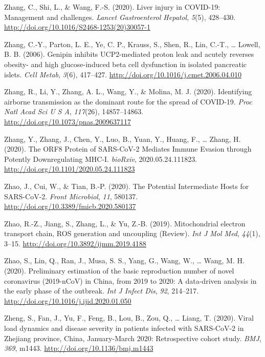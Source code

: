 \documentclass[12pt,twoside,openany,\mydriver]{thesis}  %
\begin{document}
\leavevmode\hypertarget{ref-zhang_liver_2020}{}%
Zhang, C., Shi, L., \& Wang, F.-S. (2020). Liver injury in COVID-19: Management and challenges. \emph{Lancet Gastroenterol Hepatol}, \emph{5}(5), 428--430. \url{http://doi.org/10.1016/S2468-1253(20)30057-1}

\leavevmode\hypertarget{ref-zhang_genipin_2006}{}%
Zhang, C.-Y., Parton, L. E., Ye, C. P., Krauss, S., Shen, R., Lin, C.-T., \ldots{} Lowell, B. B. (2006). Genipin inhibits UCP2-mediated proton leak and acutely reverses obesity- and high glucose-induced beta cell dysfunction in isolated pancreatic islets. \emph{Cell Metab}, \emph{3}(6), 417--427. \url{http://doi.org/10.1016/j.cmet.2006.04.010}

\leavevmode\hypertarget{ref-zhang_identifying_2020}{}%
Zhang, R., Li, Y., Zhang, A. L., Wang, Y., \& Molina, M. J. (2020). Identifying airborne transmission as the dominant route for the spread of COVID-19. \emph{Proc Natl Acad Sci U S A}, \emph{117}(26), 14857--14863. \url{http://doi.org/10.1073/pnas.2009637117}

\leavevmode\hypertarget{ref-zhang_orf8_2020}{}%
Zhang, Y., Zhang, J., Chen, Y., Luo, B., Yuan, Y., Huang, F., \ldots{} Zhang, H. (2020). The ORF8 Protein of SARS-CoV-2 Mediates Immune Evasion through Potently Downregulating MHC-I. \emph{bioRxiv}, 2020.05.24.111823. \url{http://doi.org/10.1101/2020.05.24.111823}

\leavevmode\hypertarget{ref-zhao_potential_2020}{}%
Zhao, J., Cui, W., \& Tian, B.-P. (2020). The Potential Intermediate Hosts for SARS-CoV-2. \emph{Front Microbiol}, \emph{11}, 580137. \url{http://doi.org/10.3389/fmicb.2020.580137}

\leavevmode\hypertarget{ref-zhao_mitochondrial_2019}{}%
Zhao, R.-Z., Jiang, S., Zhang, L., \& Yu, Z.-B. (2019). Mitochondrial electron transport chain, ROS generation and uncoupling (Review). \emph{Int J Mol Med}, \emph{44}(1), 3--15. \url{http://doi.org/10.3892/ijmm.2019.4188}

\leavevmode\hypertarget{ref-zhao_preliminary_2020}{}%
Zhao, S., Lin, Q., Ran, J., Musa, S. S., Yang, G., Wang, W., \ldots{} Wang, M. H. (2020). Preliminary estimation of the basic reproduction number of novel coronavirus (2019-nCoV) in China, from 2019 to 2020: A data-driven analysis in the early phase of the outbreak. \emph{Int J Infect Dis}, \emph{92}, 214--217. \url{http://doi.org/10.1016/j.ijid.2020.01.050}

\leavevmode\hypertarget{ref-zheng_viral_2020}{}%
Zheng, S., Fan, J., Yu, F., Feng, B., Lou, B., Zou, Q., \ldots{} Liang, T. (2020). Viral load dynamics and disease severity in patients infected with SARS-CoV-2 in Zhejiang province, China, January-March 2020: Retrospective cohort study. \emph{BMJ}, \emph{369}, m1443. \url{http://doi.org/10.1136/bmj.m1443}
\end{document}
